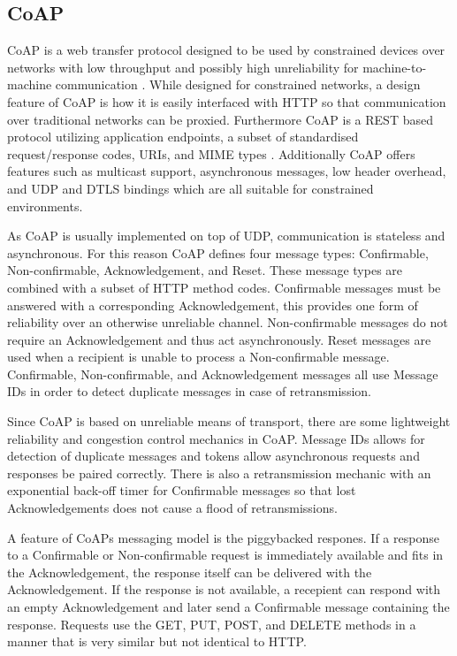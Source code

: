 \documentclass[0-thesis.tex]{subfiles}
\begin{document}
\subsection{CoAP}
CoAP is a web transfer protocol designed to be used by constrained devices over networks with 
low throughput and possibly high unreliability for machine-to-machine communication 
\parencite{rfc7252}. While designed for constrained networks, a design feature of CoAP is 
how it is easily interfaced with HTTP so that communication over traditional networks can be 
proxied. Furthermore CoAP is a REST based protocol utilizing application endpoints, a subset 
of standardised request/response codes, URIs, and MIME types \parencite{rest}. Additionally 
CoAP offers features such as multicast support, asynchronous messages, low header overhead, 
and UDP and DTLS bindings which are all suitable for constrained environments.

As CoAP is usually implemented on top of UDP, communication is stateless and asynchronous. 
For this reason CoAP defines four message types: Confirmable, Non-confirmable, Acknowledgement,
and Reset. These message types are combined with a subset of HTTP method codes. Confirmable 
messages must be answered with a corresponding Acknowledgement, this provides one form of 
reliability over an otherwise unreliable channel. Non-confirmable messages do not require an 
Acknowledgement and thus act asynchronously. Reset messages are used when a recipient is 
unable to process a Non-confirmable message. Confirmable, Non-confirmable, and Acknowledgement
messages all use Message IDs in order to detect duplicate messages in case of retransmission.

Since CoAP is based on unreliable means of transport, there are some lightweight reliability 
and congestion control mechanics in CoAP. Message IDs allows for detection of duplicate 
messages and tokens allow asynchronous requests and responses be paired correctly. There is 
also a retransmission mechanic with an exponential back-off timer for Confirmable messages so 
that lost Acknowledgements does not cause a flood of retransmissions.

A feature of CoAPs messaging model is the piggybacked respones. If a response to a 
Confirmable or Non-confirmable request is immediately available and fits in the Acknowledgement,
the response itself can be delivered with the Acknowledgement. If the response is not available, 
a recepient can respond with an empty Acknowledgement and later send a Confirmable message 
containing the response. Requests use the GET, PUT, POST, and DELETE methods in a manner that 
is very similar but not identical to HTTP.
\end{document}

